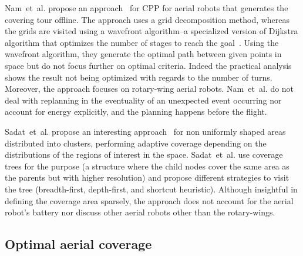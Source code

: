Nam~et~al. propose an approach~\citep{nam2016approach} for CPP for aerial robots that generates the covering tour offline. The approach uses a grid decomposition method, whereas the grids are visited using a wavefront algorithm--a specialized version of Dijkstra algorithm that optimizes the number of stages to reach the goal~\citep{lavalle2006planning}. Using the wavefront algorithm, they generate the optimal path between given points in space but do not focus further on optimal criteria. Indeed the practical analysis shows the result not being optimized with regards to the number of turns. Moreover, the approach focuses on rotary-wing aerial robots. Nam~et~al. do not deal with replanning in the eventuality of an unexpected event occurring nor account for energy explicitly, and the planning happens before the flight.

Sadat~et~al. propose an interesting approach~\citep{sadat2014recursive} for non uniformly shaped areas distributed into clusters, performing adaptive coverage depending on the distributions of the regions of interest in the space. Sadat~et~al. use coverage trees for the purpose (a structure where the child nodes cover the same area as the parents but with higher resolution) and propose different strategies to visit the tree (breadth-first, depth-first, and shortcut heuristic). Although insightful in defining the coverage area sparsely, the approach does not account for the aerial robot’s battery nor discuss other aerial robots other than the rotary-wings.

\subsection{Optimal aerial coverage}
\label{sec:opti-aero-cov}


